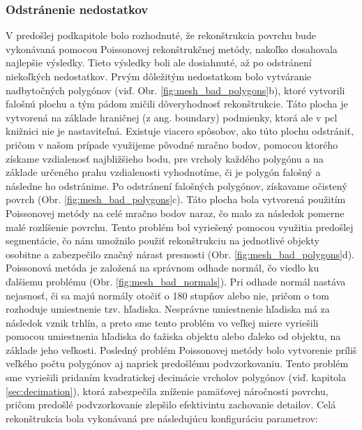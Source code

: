 \subsubsection{Odstránenie nedostatkov}
\noindent V predošlej podkapitole bolo rozhodnuté, že rekonštrukcia povrchu bude vykonávaná pomocou Poissonovej rekonštrukčnej metódy, nakoľko dosahovala najlepšie výsledky. Tieto výsledky boli ale dosiahnuté, až po odstránení niekoľkých nedostatkov. 
\newline\indent Prvým dôležitým nedostatkom bolo vytváranie nadbytočných polygónov (viď. Obr. \ref{fig:mesh_bad_polygons}b), ktoré vytvorili falošnú plochu a tým pádom zničili dôveryhodnosť rekonštrukcie. Táto plocha je vytvorená na základe hraničnej (z ang. boundary) podmienky, ktorá ale v \acrshort{pcl} knižnici nie je nastaviteľná. Existuje viacero spôsobov, ako túto plochu odstrániť, pričom v našom prípade využijeme pôvodné mračno bodov, pomocou ktorého získame vzdialenosť najbližšieho bodu, pre vrcholy každého polygónu a na základe určeného prahu vzdialenosti vyhodnotíme, či je polygón falošný a následne ho odstránime.
\newline\indent Po odstránení falošných polygónov, získavame očistený povrch (Obr. \ref{fig:mesh_bad_polygons}c). Táto plocha bola vytvorená použitím Poissonovej metódy na celé mračno bodov naraz, čo malo za následok pomerne malé rozlíšenie povrchu. Tento problém bol vyriešený pomocou využitia predošlej segmentácie, čo nám umožnilo použiť rekonštrukciu na jednotlivé objekty osobitne a zabezpečilo značný nárast presnosti (Obr. \ref{fig:mesh_bad_polygons}d).
\newline\indent Poissonová metóda je založená na správnom odhade normál, čo viedlo ku ďalšiemu problému (Obr. \ref{fig:mesh_bad_normals}). Pri odhade normál nastáva nejasnosť, či sa majú normály otočiť o 180 stupňov alebo nie, pričom o tom rozhoduje umiestnenie tzv. hľadiska. Nesprávne umiestnenie hľadiska má za následok vznik trhlín, a preto sme tento problém vo veľkej miere vyriešili pomocou umiestnenia hľadiska do ťažiska objektu alebo ďaleko od objektu, na základe jeho veľkosti.
\newline\indent Posledný problém Poissonovej metódy bolo vytvorenie príliš veľkého počtu polygónov aj napriek predošlému podvzorkovaniu. Tento problém sme vyriešili pridaním kvadratickej decimácie vrcholov polygónov (viď. kapitola \ref{sec:decimation}), ktorá zabezpečila zníženie pamäťovej náročnosti povrchu, pričom predošlé podvzorkovanie zlepšilo efektivintu zachovanie detailov.
\newline\indent Celá rekonštrukcia bola vykonávaná pre následujúcu konfiguráciu parametrov:

